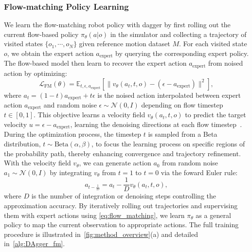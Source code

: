 
\subsubsection{Flow-matching Policy Learning}
We learn the flow-matching robot policy with \ac{dagger} by first rolling out the current flow-based policy $\pi_\theta(a|o)$ in the simulator and collecting a trajectory of visited states $\{o_1, \cdots, o_N\}$ given reference motion dataset $M$. For each visited state $o$, we obtain the expert action $a_{\text{expert}}$ by querying the corresponding expert policy. The flow-based model then learn to recover the expert action $a_{\text{expert}}$ from noised action by optimizing:
\begin{equation}
\label{eq:flow_matching}
\mathcal{L}_{\text{FM}}(\theta) = \mathbb{E}_{t, \epsilon, a_{\text{expert}}} \left[ \| v_\theta(a_t, t, o) - (\epsilon - a_{\text{expert}}) \|^2 \right],
\end{equation}
where $a_t = (1 - t) a_{\text{expert}} + t \epsilon$ is the noised action interpolated between expert action $a_{\text{expert}}$ and random noise $\epsilon\sim\mathcal{N}(0,I)$ depending on flow timestep $t\in[0,1]$. This objective learns a velocity field $v_\theta(a_t,t,o)$ to predict the target velocity $u = \epsilon - a_{\text{expert}}$, learning the denoising directions at each flow timestep~\cite{lipman2022flow}. During the optimization process, the timestep $t$ is sampled from a Beta distribution, $t \sim \mathrm{Beta}(\alpha, \beta)$, to focus the learning process on specific regions of the probability path, thereby enhancing convergence and trajectory refinement. With the velocity field $v_\theta$, we can generate action $a_0$ from random noise $a_1 \sim \mathcal{N}(0,I)$ by integrating $v_\theta$ from $t=1$ to $t=0$ via the foward Euler rule:
\begin{equation}
a_{t-\frac{1}{D}} = a_t - \frac{1}{D}v_\theta(a_t,t,o),
\end{equation}
where $D$ is the number of integration or denoising steps controlling the approximation accuracy.  By iteratively rolling out trajectories and supervising them with expert actions using \cref{eq:flow_matching}, we learn $\pi_\theta$ as a general policy to map the current observation to appropriate actions. The full training procedure is illustrated in~\cref{fig:method_overview}(a) and detailed in~\cref{alg:DAgger_fm}.



